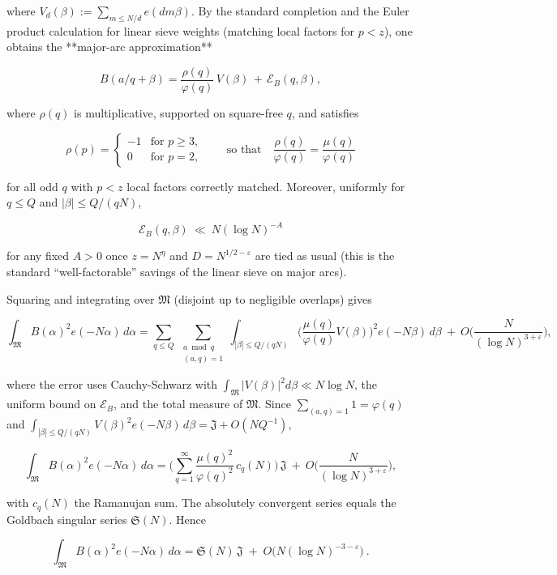 \documentclass[11pt]{article}
\theoremstyle{definition}
\theoremstyle{remark}
\begin{document}
where $V_d(\beta):=\sum_{m\le N/d}e(dm\beta)$. By the standard completion and the Euler product calculation for linear sieve weights (matching local factors for $p<z$), one obtains the **major-arc approximation**

$$
	B(a/q+\beta)=\frac{\rho(q)}{\varphi(q)}\,V(\beta)\,+\,\mathcal E_B(q,\beta),
$$

where $\rho(q)$ is multiplicative, supported on square-free $q$, and satisfies

$$
	\rho(p)=
	\begin{cases}
		-1 & \text{for } p\ge 3, \\
		0  & \text{for } p=2,
	\end{cases}
	\qquad\text{so that}\quad \frac{\rho(q)}{\varphi(q)}=\frac{\mu(q)}{\varphi(q)}
$$

for all odd $q$ with $p<z$ local factors correctly matched. Moreover, uniformly for $q\le Q$ and $|\beta|\le Q/(qN)$,

$$
	\mathcal E_B(q,\beta)\ \ll\ N(\log N)^{-A}
$$

for any fixed $A>0$ once $z=N^\eta$ and $D=N^{1/2-\varepsilon}$ are tied as usual (this is the standard “well-factorable” savings of the linear sieve on major arcs).

Squaring and integrating over $\mathfrak M$ (disjoint up to negligible overlaps) gives

$$
	\int_{\mathfrak M} B(\alpha)^2 e(-N\alpha)\,d\alpha
	= \sum_{q\le Q}\ \sum_{\substack{a\bmod q\\(a,q)=1}}
	\int_{|\beta|\le Q/(qN)}
	\Big(\frac{\mu(q)}{\varphi(q)}V(\beta)\Big)^{\!2} e(-N\beta)\,d\beta
	\ +\ O\!\Big(\frac{N}{(\log N)^{3+\varepsilon}}\Big),
$$

where the error uses Cauchy-Schwarz with $\int_{\mathfrak M}|V(\beta)|^2 d\beta\ll N\log N$, the uniform bound on $\mathcal E_B$, and the total measure of $\mathfrak M$.
Since $\sum_{(a,q)=1}1=\varphi(q)$ and $\int_{|\beta|\le Q/(qN)}V(\beta)^2 e(-N\beta)\,d\beta=\mathfrak J+O(NQ^{-1})$,

$$
	\int_{\mathfrak M} B(\alpha)^2 e(-N\alpha)\,d\alpha
	= \Big(\sum_{q=1}^{\infty}\frac{\mu(q)^2}{\varphi(q)^2}\,c_q(N)\Big)\,\mathfrak J
	\ +\ O\!\Big(\frac{N}{(\log N)^{3+\varepsilon}}\Big),
$$

with $c_q(N)$ the Ramanujan sum. The absolutely convergent series equals the Goldbach singular series $\mathfrak S(N)$. Hence

$$
	\boxed{\,\int_{\mathfrak M} B(\alpha)^2 e(-N\alpha)\,d\alpha
		=\mathfrak S(N)\,\mathfrak J\;+\;O\!\big(N(\log N)^{-3-\varepsilon}\big)\ .\ }
$$
\end{document}
